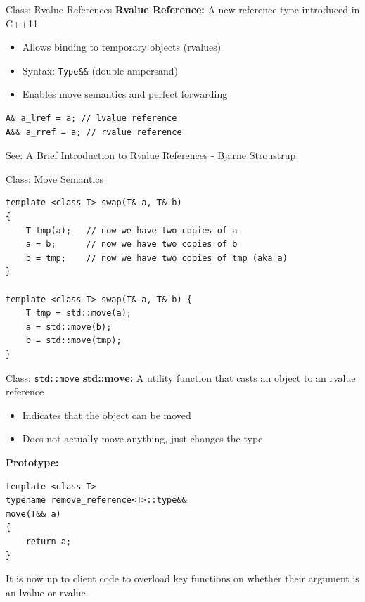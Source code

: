 \begin{frame}[fragile]{Class: Rvalue References}
	\textbf{Rvalue Reference:} A new reference type introduced in C++11
	\begin{itemize}
		\item Allows binding to temporary objects (rvalues)
		\item Syntax: \texttt{Type\&\&} (double ampersand)
		\item Enables move semantics and perfect forwarding
	\end{itemize}

	\begin{verbatim}
A& a_lref = a; // lvalue reference
A&& a_rref = a; // rvalue reference
	\end{verbatim}

    See: \textcolor{blue}{\href{https://www.open-std.org/jtc1/sc22/wg21/docs/papers/2006/n2027.html}{A Brief Introduction to Rvalue References - Bjarne Stroustrup}}
\end{frame}

\begin{frame}[fragile]{Class: Move Semantics}
	\begin{verbatim}
template <class T> swap(T& a, T& b)
{
    T tmp(a);   // now we have two copies of a
    a = b;      // now we have two copies of b
    b = tmp;    // now we have two copies of tmp (aka a)
}

template <class T> swap(T& a, T& b) {
    T tmp = std::move(a);
    a = std::move(b);
    b = std::move(tmp);
}
    \end{verbatim}
\end{frame}

\begin{frame}[fragile]{Class: \texttt{std::move}}
    \textbf{std::move:} A utility function that casts an object to an rvalue reference
    \begin{itemize}
        \item Indicates that the object can be moved
        \item Does not actually move anything, just changes the type
    \end{itemize}

    \textbf{Prototype:}
    \begin{verbatim}
template <class T>
typename remove_reference<T>::type&&
move(T&& a)
{
    return a;
}
    \end{verbatim}
    It is now up to client code to overload key functions on whether their argument is an lvalue or rvalue.
\end{frame}

